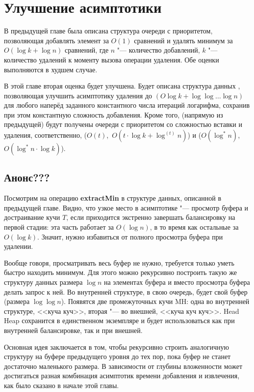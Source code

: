 \chapter{Улучшение асимптотики} \label{chapt-ch}

В предыдущей главе была описана структура очереди с приоритетом, позволяющая
добавлять элемент за $O(1)$ сравнений и удалять минимум за $O(\log k + \log n)$
сравнений, где $n$ "--- количество добавлений, $k$ "--- количество удалений
к моменту вызова операции удаления. Обе оценки выполняются в худшем случае.

В этой главе вторая оценка будет улучшена.  Будет описана структура данных \CH,
позволяющая улучшить асимптотику удаления до $(O\log k + \log \log \dots \log n)$
для любого наперёд заданного константного числа итераций логарифма, сохранив при
этом константную сложность добавления. Кроме того, (напрямую из предыдущей)
будут получены очереди с приоритетом со сложностью вставки и удаления,
соответственно, ($O(t)$,~$O(t \cdot \log k + \log ^{(t)} n)$) и
($O(\log^* n)$,~$O(\log^* n \cdot \log k)$).

\section*{Анонс???}

Посмотрим на операцию \textbf{extractMin} в структуре данных, описанной в предыдущей
главе. Видно, что узкое место в асимптотике "--- просмотр буфера и достраивание
кучи $T$, если приходится экстренно завершать балансировку на первой стадии:
эта часть работает за $O(\log n)$, в то время как остальные за $O(\log k)$.
Значит, нужно избавиться от полного просмотра буфера при удалении.

Вообще говоря, просматривать весь буфер не нужно, требуется только уметь быстро
находить минимум. Для этого можно рекурсивно построить такую же структуру данных
размера $\log n$ на элементах буфера и вместо просмотра буфера делать запрос к ней.
Во внутренней структуре, в свою очередь, будет свой буфер (размера $\log \log n$).
Появятся две промежуточных кучи MH: одна во внутренней структуре, <<куча куч>>,
вторая "--- во внешней, <<куча куч куч>>. Head Heap сохранится в единственном
экземпляре и будет использоваться как при внутренней балансировке, так и при внешней.

Основная идея \CH заключается в том, чтобы рекурсивно строить аналогичную
структуру на буфере предыдущего уровня до тех пор, пока буфер не станет достаточно
маленького размера. В зависимости от глубины вложенности может достигаться
разная комбинация асимптотик времени добавления и извлечения, как было сказано
в начале этой главы.


